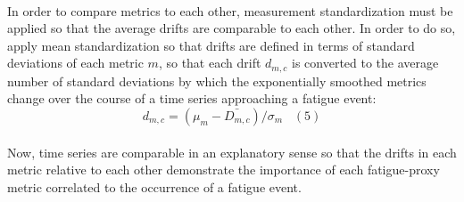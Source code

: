 \documentclass[12 pt]{article}
\begin{document}
\\ \indent In order to compare metrics to each other, measurement standardization must be applied 
so that the average drifts are comparable to each other. In order to do so, apply mean 
standardization so that drifts are defined in terms of standard deviations of each metric $m$, so 
that each drift $d_{m, c}$ is converted to the average number of standard deviations by which the 
exponentially smoothed metrics change over the course of a time series approaching a fatigue 
event: \[d_{m, c} = (\mu_m - \bar{D_{m, c}}) / \sigma_m\;\;\;(5)\]
\\ \indent Now, time series are comparable in an explanatory sense so that the drifts in each 
metric relative to each other demonstrate the importance of each fatigue-proxy metric 
correlated to the occurrence of a fatigue event.\\
\end{document}
